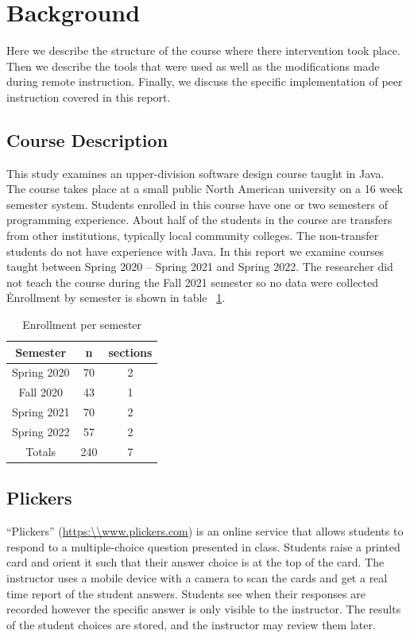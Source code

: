 \documentclass{article}
\begin{document}
\section{Background}

Here we describe the structure of the course where there intervention took place. Then we describe the tools that were used as well as the modifications made during remote instruction. Finally, we discuss the specific implementation of peer instruction covered in this report.

\subsection{Course Description}
This study examines an upper-division software design course taught in Java. The course takes place at a small public North American university on a 16 week semester system. Students enrolled in this course have one or two semesters of programming experience. About half of the students in the course are transfers from other institutions, typically local community colleges. The non-transfer students do not have experience with Java. 
In this report we examine courses taught between Spring 2020 – Spring 2021 and Spring 2022.  The researcher did not teach the course during the Fall 2021 semester so no data were collected \. Enrollment by semester is shown in table ~\ref{table:enrollmentBySemester}.

\begin{table}[ht]
\caption{Enrollment per semester}
\begin{tabular}{|c|c|c|}
\toprule
Semester    & n  & sections\\ \midrule
\rowcolor{LightGray}
Spring 2020 & 70 & 2 \\ \midrule
Fall 2020   & 43 & 1 \\ \midrule
\rowcolor{LightGray}
Spring 2021 & 70 & 2 \\ \midrule
Spring 2022 & 57 & 2 \\ \midrule
\rowcolor{LightGray}
Totals & 240 & 7 \\ \bottomrule
\end{tabular}
\label{table:enrollmentBySemester}
\end{table}

\subsection{Plickers}
``Plickers'' (\url{https:\\www.plickers.com}) is an online service that allows students to respond to a multiple-choice question presented in class. Students raise a printed card and orient it such that their answer choice is at the top of the card. The instructor uses a mobile device with a camera to scan the cards and get a real time report of the student answers. Students see when their responses are recorded however the specific answer is only visible to the instructor. The results of the student choices are stored, and the instructor may review them later. 
\end{document}
